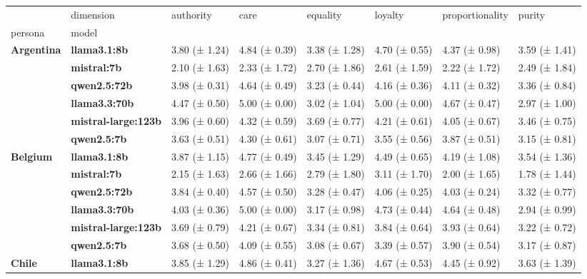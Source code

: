\begin{tabular}{llllllll}
\toprule
 & dimension & authority & care & equality & loyalty & proportionality & purity \\
persona & model &  &  &  &  &  &  \\
\midrule
\multirow[t]{6}{*}{\textbf{Argentina}} & \textbf{llama3.1:8b} & 3.80 (± 1.24) & 4.84 (± 0.39) & 3.38 (± 1.28) & 4.70 (± 0.55) & 4.37 (± 0.98) & 3.59 (± 1.41) \\
\textbf{} & \textbf{mistral:7b} & 2.10 (± 1.63) & 2.33 (± 1.72) & 2.70 (± 1.86) & 2.61 (± 1.59) & 2.22 (± 1.72) & 2.49 (± 1.84) \\
\textbf{} & \textbf{qwen2.5:72b} & 3.98 (± 0.31) & 4.64 (± 0.49) & 3.23 (± 0.44) & 4.16 (± 0.36) & 4.11 (± 0.32) & 3.36 (± 0.84) \\
\textbf{} & \textbf{llama3.3:70b} & 4.47 (± 0.50) & 5.00 (± 0.00) & 3.02 (± 1.04) & 5.00 (± 0.00) & 4.67 (± 0.47) & 2.97 (± 1.00) \\
\textbf{} & \textbf{mistral-large:123b} & 3.96 (± 0.60) & 4.32 (± 0.59) & 3.69 (± 0.77) & 4.21 (± 0.61) & 4.05 (± 0.67) & 3.46 (± 0.75) \\
\textbf{} & \textbf{qwen2.5:7b} & 3.63 (± 0.51) & 4.30 (± 0.61) & 3.07 (± 0.71) & 3.55 (± 0.56) & 3.87 (± 0.51) & 3.15 (± 0.81) \\
\cline{1-8}
\multirow[t]{6}{*}{\textbf{Belgium}} & \textbf{llama3.1:8b} & 3.87 (± 1.15) & 4.77 (± 0.49) & 3.45 (± 1.29) & 4.49 (± 0.65) & 4.19 (± 1.08) & 3.54 (± 1.36) \\
\textbf{} & \textbf{mistral:7b} & 2.15 (± 1.63) & 2.66 (± 1.66) & 2.79 (± 1.80) & 3.11 (± 1.70) & 2.00 (± 1.65) & 1.78 (± 1.44) \\
\textbf{} & \textbf{qwen2.5:72b} & 3.84 (± 0.40) & 4.57 (± 0.50) & 3.28 (± 0.47) & 4.06 (± 0.25) & 4.03 (± 0.24) & 3.32 (± 0.77) \\
\textbf{} & \textbf{llama3.3:70b} & 4.03 (± 0.36) & 5.00 (± 0.00) & 3.17 (± 0.98) & 4.73 (± 0.44) & 4.64 (± 0.48) & 2.94 (± 0.99) \\
\textbf{} & \textbf{mistral-large:123b} & 3.69 (± 0.79) & 4.21 (± 0.67) & 3.34 (± 0.81) & 3.84 (± 0.64) & 3.93 (± 0.64) & 3.22 (± 0.72) \\
\textbf{} & \textbf{qwen2.5:7b} & 3.68 (± 0.50) & 4.09 (± 0.55) & 3.08 (± 0.67) & 3.39 (± 0.57) & 3.90 (± 0.54) & 3.17 (± 0.87) \\
\cline{1-8}
\multirow[t]{6}{*}{\textbf{Chile}} & \textbf{llama3.1:8b} & 3.85 (± 1.29) & 4.86 (± 0.41) & 3.27 (± 1.36) & 4.67 (± 0.53) & 4.45 (± 0.92) & 3.63 (± 1.39) \\

\end{tabular}
